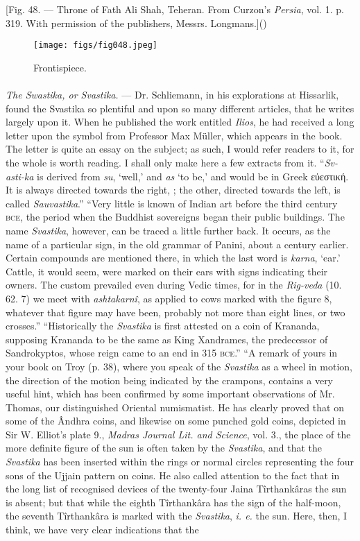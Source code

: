 \documentclass[a4paper, 11pt, oneside, polutonikogreek, english]{article}
\begin{document}
[Fig. 48. --- Throne of Fath Ali Shah, Teheran. From Curzon's \emph{Persia}, vol. 1. p. 319. With permission of the publishers, Messrs. Longmans.]()
\begin{figure}[H]
\centering
\texttt{[image: figs/fig048.jpeg]}
\caption{Frontispiece.}
\end{figure}
\paragraph{}
\emph{The Swastika, or Svastika.} --- Dr. Schliemann, in his explorations at Hissarlik, found the Svastika so plentiful and upon so many different articles, that he writes largely upon it. When he published the work entitled \emph{Ilios}, he had received a long letter upon the symbol from Professor Max Müller, which appears in the book. The letter is quite an essay on the subject; as such, I would refer readers to it, for the whole is worth reading. I shall only make here a few extracts from it. ``\emph{Sv-asti-ka} is derived from \emph{su}, `well,' and \emph{as} `to be,' and would be in Greek εὐεστική. It is always directed towards the right, ; the other, directed towards the left,  is called \emph{Sauvastika}.'' ``Very little is known of Indian art before the third century \textsc{bce}, the period when the Buddhist sovereigns began their public buildings. The name \emph{Svastika}, however, can be traced a little further back. It occurs, as the name of a particular sign, in the old grammar of Panini, about a century earlier. Certain compounds are mentioned there, in which the last word is \emph{karna}, `ear.' Cattle, it would seem, were marked on their ears with signs indicating their owners. The custom prevailed even during Vedic times, for in the \emph{Rig-veda} (10. 62. 7) we meet with \emph{ashtakarnî}, as applied to cows marked with the figure 8, whatever that figure may have been, probably not more than eight lines, or two crosses.'' ``Historically the \emph{Svastika} is first attested on a coin of Krananda, supposing Krananda to be the same as King Xandrames, the predecessor of Sandrokyptos, whose reign came to an end in 315 \textsc{bce}.'' ``A remark of yours in your book on Troy (p. 38), where you speak of the \emph{Svastika} as a wheel in motion, the direction of the motion being indicated by the crampons, contains a very useful hint, which has been confirmed by some important observations of Mr. Thomas, our distinguished Oriental numismatist. He has clearly proved that on some of the Ândhra coins, and likewise on some punched gold coins, depicted in Sir W. Elliot's plate 9., \emph{Madras Journal Lit. and Science}, vol. 3., the place of the more definite figure of the sun is often taken by the \emph{Svastika}, and that the \emph{Svastika} has been inserted within the rings or normal circles representing the four sons of the Ujjain pattern on coins. He also called attention to the fact that in the long list of recognised devices of the twenty-four Jaina Tîrthankâras the sun is absent; but that while the eighth Tîrthankâra has the sign of the half-moon, the seventh Tîrthankâra is marked with the \emph{Svastika}, \emph{i. e.} the sun. Here, then, I think, we have very clear indications that the 
\end{document}
